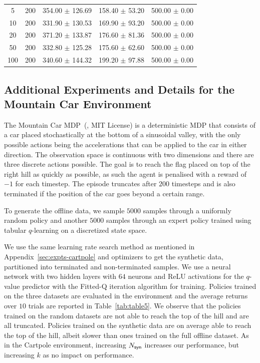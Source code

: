 \begin{table}[h!]
\begin{tabular}{ccccc}
5 & 200 & 354.00 $\pm$ 126.69 & 158.40 $\pm$ 53.20 & 500.00 $\pm$ 0.00 \\
10 & 200 & 331.90 $\pm$ 130.53 & 169.90 $\pm$ 93.20 & 500.00 $\pm$ 0.00 \\ 
20 & 200 & 371.20 $\pm$ 133.87 & 176.60 $\pm$ 81.36 & 500.00 $\pm$ 0.00 \\ 
50 & 200 & 332.80 $\pm$ 125.28 & 175.60 $\pm$ 62.60 & 500.00 $\pm$ 0.00 \\ 
100 & 200 & 340.60 $\pm$ 144.32 & 199.20 $\pm$ 97.88 & 500.00 $\pm$ 0.00 \\ \hline
\end{tabular}
\label{tab:table3}
\end{table}

\subsection{Additional Experiments and Details for the Mountain Car Environment} \label{sec:expts-mountain}

The Mountain Car MDP~(\cite{moore1990}, \cite{Cartpole} MIT License) is a deterministic MDP that consists of a car placed stochastically at the bottom of a sinusoidal valley, with the only possible actions being the accelerations that can be applied to the car in either direction. The observation space is continuous with two dimensions and there are three discrete actions possible. The goal is to reach the flag placed on top of the right hill as quickly as possible, as such the agent is penalised with a reward of $-1$ for each timestep. The episode truncates after $200$ timesteps and is also terminated if the position of the car goes beyond a certain range. 

To generate the offline data, we sample $5000$ samples through a uniformly random policy and another $5000$ samples through an expert policy trained using tabular $q$-learning on a discretized state space.

We use the same learning rate search method as mentioned in Appendix~\ref{sec:expts-cartpole} and optimizers to get the synthetic data, partitioned into terminated and non-terminated samples. We use a neural network with two hidden layers with $64$ neurons and ReLU activations for the $q$-value predictor with the Fitted-Q iteration algorithm for training. Policies trained on the three datasets are evaluated in the environment and the average returns over $10$ trials are reported in Table~\ref{tab:table5}. We observe that the policies trained on the random datasets are not able to reach the top of the hill and are all truncated. Policies trained on the synthetic data are on average able to reach the top of the hill, albeit slower than ones trained on the full offline dataset. As in the Cartpole environment, increasing $N_{\sf syn}$ increases our performance, but increasing $k$ as no impact on performance.





